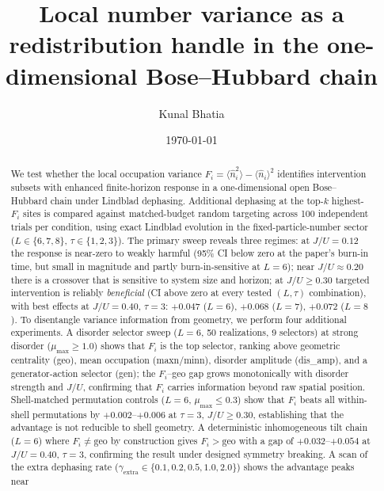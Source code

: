 \documentclass[aps,pra,reprint,amsmath,amssymb,longbibliography,floatfix]{revtex4-2}
\newcommand{\Fi}{F_i}
\newcommand{\nop}{\hat{n}}
\begin{document}
\title{Local number variance as a redistribution handle in the one-dimensional Bose--Hubbard chain}

\author{Kunal Bhatia}

\date{\today}

\begin{abstract}
We test whether the local occupation variance
$\Fi = \langle\nop_i^2\rangle - \langle\nop_i\rangle^2$ identifies
intervention subsets with enhanced finite-horizon response in a
one-dimensional open Bose--Hubbard chain under Lindblad dephasing.
Additional dephasing at the top-$k$ highest-$\Fi$ sites is compared
against matched-budget random targeting across 100 independent trials
per condition, using exact Lindblad evolution in the fixed-particle-number
sector ($L\in\{6,7,8\}$, $\tau\in\{1,2,3\}$).
The primary sweep reveals three regimes: at $J/U=0.12$ the response is
near-zero to weakly harmful (95\% CI below zero at the paper's burn-in
time, but small in magnitude and partly burn-in-sensitive at $L=6$);
near $J/U\approx0.20$ there is a crossover that is sensitive to system size
and horizon; at $J/U\geq0.30$ targeted intervention is reliably
\emph{beneficial} (CI above zero at every tested $(L,\tau)$ combination),
with best effects at $J/U=0.40$, $\tau=3$: $+0.047$ ($L=6$), $+0.068$
($L=7$), $+0.072$ ($L=8$).
To disentangle variance information from geometry, we perform four
additional experiments.
A disorder selector sweep ($L=6$, 50 realizations, 9 selectors) at strong
disorder ($\mu_{\max}\geq1.0$) shows that $\Fi$ is the top selector,
ranking above geometric centrality (geo), mean occupation (maxn/minn),
disorder amplitude (dis\_amp), and a generator-action selector (gen); the
$\Fi$--geo gap grows monotonically with disorder strength and $J/U$,
confirming that $\Fi$ carries information beyond raw spatial position.
Shell-matched permutation controls ($L=6$, $\mu_{\max}\leq0.3$) show that
$\Fi$ beats all within-shell permutations by $+0.002$--$+0.006$ at
$\tau=3$, $J/U\geq0.30$, establishing that the advantage is not reducible
to shell geometry.
A deterministic inhomogeneous tilt chain ($L=6$) where $\Fi\neq\mathrm{geo}$
by construction gives $\Fi>\mathrm{geo}$ with a gap of $+0.032$--$+0.054$
at $J/U=0.40$, $\tau=3$, confirming the result under designed symmetry
breaking.
A scan of the extra dephasing rate ($\gamma_{\mathrm{extra}}\in
\{0.1,0.2,0.5,1.0,2.0\}$) shows the advantage peaks near

\end{abstract}
\end{document}
